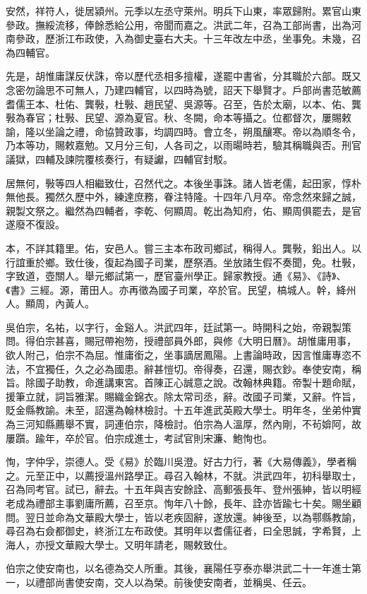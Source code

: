 \begin{pinyinscope}
安然，祥符人，徙居潁州。元季以左丞守萊州。明兵下山東，率眾歸附。累官山東參政。撫綏流移，俸餘悉給公用，帝聞而嘉之。洪武二年，召為工部尚書，出為河南參政，歷浙江布政使，入為御史臺右大夫。十三年改左中丞，坐事免。未幾，召為四輔官。

先是，胡惟庸謀反伏誅，帝以歷代丞相多擅權，遂罷中書省，分其職於六部。既又念密勿論思不可無人，乃建四輔官，以四時為號，詔天下舉賢才。戶部尚書范敏薦耆儒王本、杜佑、龔斅，杜斅、趙民望、吳源等。召至，告於太廟，以本、佑、龔斅為春官；杜斅、民望、源為夏官。秋、冬闕，命本等攝之。位都督次，屢賜敕諭，隆以坐論之禮，命協贊政事，均調四時。會立冬，朔風釀寒。帝以為順冬令，乃本等功，賜敕嘉勉。又月分三旬，人各司之，以雨暘時若，驗其稱職與否。刑官議獄，四輔及諫院覆核奏行，有疑讞，四輔官封駁。

居無何，斅等四人相繼致仕，召然代之。本後坐事誅。諸人皆老儒，起田家，惇朴無他長。獨然久歷中外，練達庶務，眷注特隆。十四年八月卒。帝念然來歸之誠，親製文祭之。繼然為四輔者，李乾、何顯周。乾出為知府，佑、顯周俱罷去，是官遂廢不復設。

本，不詳其籍里。佑，安邑人。嘗三主本布政司鄉試，稱得人。龔斅，鉛出人。以行誼重於鄉。致仕後，復起為國子司業，歷祭酒。坐放諸生假不奏聞，免。杜斅，字致道，壺關人。舉元鄉試第一，歷官臺州學正。歸家教授。通《易》、《詩》、《書》三經。源，莆田人。亦再徵為國子司業，卒於官。民望，槁城人。幹，絳州人。顯周，內黃人。

吳伯宗，名祐，以字行，金谿人。洪武四年，廷試第一。時開科之始，帝親製策問。得伯宗甚喜，賜冠帶袍笏，授禮部員外郎，與修《大明日曆》。胡惟庸用事，欲人附己，伯宗不為屈。惟庸銜之，坐事謫居鳳陽。上書論時政，因言惟庸專恣不法，不宜獨任，久之必為國患。辭甚愷切。帝得奏，召還，賜衣鈔。奉使安南，稱旨。除國子助教，命進講東宮。首陳正心誠意之說。改翰林典籍。帝製十題命賦，援筆立就，詞旨雅潔。賜織金錦衣。除太常司丞，辭。改國子司業，又辭。忤旨，貶金縣教諭。未至，詔還為翰林檢討。十五年進武英殿大學士。明年冬，坐弟仲實為三河知縣薦舉不實，詞連伯宗，降檢討。伯宗為人溫厚，然內剛，不茍媕阿，故屢躓。踰年，卒於官。伯宗成進士，考試官則宋濂、鮑恂也。

恂，字仲孚，崇德人。受《易》於臨川吳澄。好古力行，著《大易傳義》，學者稱之。元至正中，以薦授溫州路學正。尋召入翰林，不就。洪武四年，初科舉取士，召為同考官。試已，辭去。十五年與吉安餘詮、高郵張長年、登州張紳，皆以明經老成為禮部主事劉庸所薦，召至京。恂年八十餘，長年、詮亦皆踰七十矣。賜坐顧問。翌日並命為文華殿大學士，皆以老疾固辭，遂放還。紳後至，以為鄠縣教諭，尋召為右僉都御史，終浙江左布政使。其明年以耆儒征者，曰全思誠，字希賢，上海人，亦授文華殿大學士。又明年請老，賜敕致仕。

伯宗之使安南也，以名德為交人所重。其後，襄陽任亨泰亦舉洪武二十一年進士第一，以禮部尚書使安南，交人以為榮。前後使安南者，並稱吳、任云。


\end{pinyinscope}
